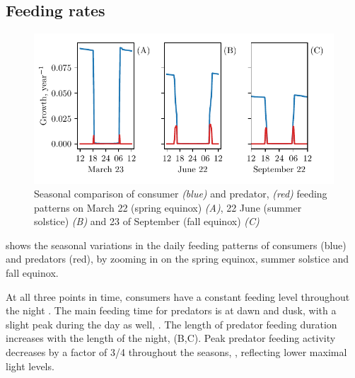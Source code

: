 \subsection*{Feeding rates}
\begin{figure}[H]
\includegraphics{plots/growth_short_rational.pdf}
\caption{Seasonal comparison of consumer \emph{(blue)} and predator, \emph{(red)} feeding patterns on March 22 (spring equinox) \emph{(A)}, 22 June (summer solstice) \emph{(B)} and 23 of September (fall equinox) \emph{(C)}}
\label{fig:growth_short_rational}
\end{figure}
 shows the seasonal variations in the daily feeding patterns of consumers (blue) and predators (red), by zooming in on the spring equinox, summer solstice and fall equinox.

At all three points in time, consumers have a constant feeding level throughout the night . The main feeding time for predators is at dawn and dusk, with a slight peak during the day as well, . The length of predator feeding duration increases with the length of the night,  (B,C). Peak predator feeding activity decreases by a factor of 3/4 throughout the seasons, , reflecting lower maximal light levels.


